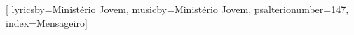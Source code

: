 


\setcounter{songnum}{147}

[
lyricsby={Ministério Jovem}, 
musicby={Ministério Jovem},
psalterionumber=147,
index={Mensageiro}]


\beginverse*
{\nolyrics Intro: \[F#m] \[D]  \[A] \[E] \[D] \[E] \[A]}
\endverse

